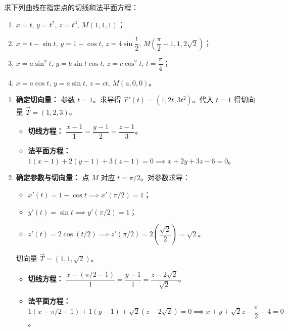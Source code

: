 \documentclass[lang=cn,11pt]{elegantbook}
\begin{document}
\begin{exercise}[切线与法平面的几何计算]
求下列曲线在指定点的切线和法平面方程：
\begin{enumerate}
    \item[(1)] $x=t,\,y=t^2,\,z=t^3,\,M(1,1,1)$；
    \item[(2)] $x=t-\sin t,\,y=1-\cos t,\,z=4\sin\dfrac{t}{2},\,M\left(\dfrac{\pi}{2}-1,1,2\sqrt{2}\right)$；
    \item[(3)] $x=a\sin^2 t,\,y=b\sin t\cos t,\,z=c\cos^2 t,\,t=\dfrac{\pi}{4}$；
    \item[(4)] $x=a\cos t,\,y=a\sin t,\,z=ct,\,M(a,0,0)$。
\end{enumerate}
\end{exercise}
\begin{solution}
\begin{enumerate}
    \item[(1)] \textbf{确定切向量：} 参数 $t=1$。求导得 $\vec{r}'(t) = (1, 2t, 3t^2)$。代入 $t=1$ 得切向量 $\vec{T} = (1, 2, 3)$。
    \begin{itemize}
        \item \textbf{切线方程：} $\dfrac{x-1}{1} = \dfrac{y-1}{2} = \dfrac{z-1}{3}$。
        \item \textbf{法平面方程：} $1(x-1) + 2(y-1) + 3(z-1) = 0 \implies x+2y+3z-6=0$。
    \end{itemize}

    \item[(2)] \textbf{确定参数与切向量：} 点 $M$ 对应 $t = \pi/2$。对参数求导：
    \begin{itemize}
        \item $x'(t) = 1-\cos t \implies x'(\pi/2) = 1$；
        \item $y'(t) = \sin t \implies y'(\pi/2) = 1$；
        \item $z'(t) = 2\cos(t/2) \implies z'(\pi/2) = 2\left(\dfrac{\sqrt{2}}{2}\right) = \sqrt{2}$。
    \end{itemize}
    切向量 $\vec{T} = (1, 1, \sqrt{2})$。
    \begin{itemize}
        \item \textbf{切线方程：} $\dfrac{x-(\pi/2-1)}{1} = \dfrac{y-1}{1} = \dfrac{z-2\sqrt{2}}{\sqrt{2}}$。
        \item \textbf{法平面方程：} $1(x-\pi/2+1) + 1(y-1) + \sqrt{2}(z-2\sqrt{2}) = 0 \implies x+y+\sqrt{2}z - \dfrac{\pi}{2} - 4 = 0$。
    \end{itemize}


\end{enumerate}
\end{solution}
\end{document}
